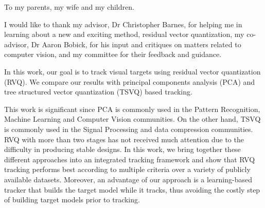 


%
%
%
%
%
%
%








\begin{FrontMatter}

\begin{dedication}
To my parents, my wife and my children.
\end{dedication}

\begin{acknowledgement}
I would like to thank my advisor, Dr Christopher Barnes, for helping me in learning about a new and exciting method, residual vector quantization, my co-advisor, Dr Aaron Bobick, for his input and critiques on matters related to computer vision, and my committee for their feedback and guidance.\newpage
\end{acknowledgement}

\contents %

\end{FrontMatter}



\begin{summary}
In this work, our goal is to track visual targets using residual vector quantization (RVQ).  We compare our results with principal components analysis (PCA) and tree structured vector quantization (TSVQ) based tracking.

This work is significant since PCA is commonly used in the Pattern Recognition, Machine Learning and Computer Vision communities. On the other hand, TSVQ is commonly used in the Signal Processing and data compression communities. RVQ with more than two stages has not received much attention due to the difficulty in producing stable designs. In this work, we bring together these different approaches into an integrated tracking framework and show that RVQ tracking performs best according to multiple criteria over a variety of publicly available datasets. Moreover, an advantage of our approach is a learning-based tracker that builds the target model while it tracks, thus avoiding the costly step of building target models prior to tracking.
\end{summary}


